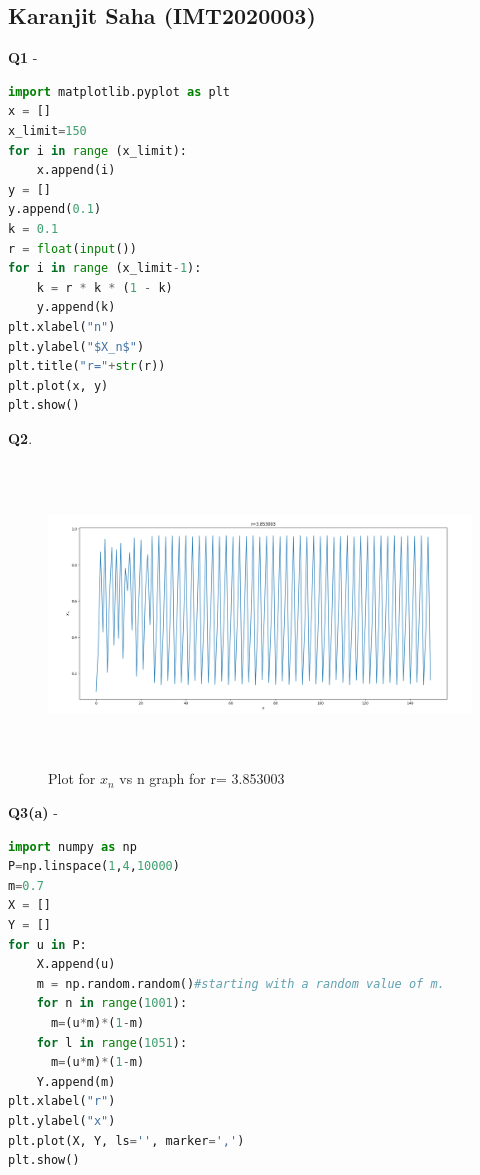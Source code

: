 \documentclass[11pt]{scrartcl} %
\begin{document}
\subsection{Karanjit Saha (IMT2020003)}
\textbf{Q1} -
\begin{lstlisting}[language=Python, caption= Code for plotting $X_n$ vs n graph for a given r]
import matplotlib.pyplot as plt
x = []
x_limit=150
for i in range (x_limit):
    x.append(i)
y = []
y.append(0.1)
k = 0.1
r = float(input())
for i in range (x_limit-1):
    k = r * k * (1 - k)
    y.append(k)
plt.xlabel("n")
plt.ylabel("$X_n$")
plt.title("r="+str(r))
plt.plot(x, y)
plt.show()
\end{lstlisting}
\textbf{Q2}.
\begin{figure}[h] %
	\centering
	\includegraphics[width=12cm, height=8cm]{Karanjit.png} %
	\caption {Plot for $x_n$ vs n graph for r= 3.853003}
\end{figure}
\newpage
\textbf{Q3(a)} -
\begin{lstlisting}[language=Python, caption= Bifurcation diagram]
import numpy as np
P=np.linspace(1,4,10000)
m=0.7
X = []
Y = []
for u in P:
    X.append(u)
    m = np.random.random()#starting with a random value of m.
    for n in range(1001):
      m=(u*m)*(1-m)
    for l in range(1051):
      m=(u*m)*(1-m)
    Y.append(m)
plt.xlabel("r")
plt.ylabel("x")
plt.plot(X, Y, ls='', marker=',')
plt.show()
\end{lstlisting}
\newpage
\end{document}
